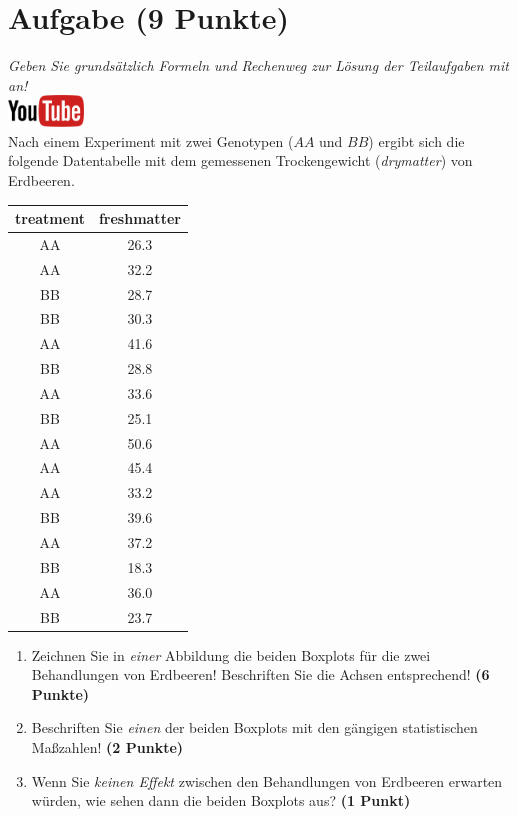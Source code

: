 \documentclass[a4paper, 10pt]{scrartcl}\usepackage[]{graphicx}\usepackage[]{xcolor}
\begin{document}
 
\clearpage

\section{Aufgabe \hfill (9 Punkte)}

\textit{Geben Sie grunds{\"a}tzlich Formeln und Rechenweg zur L{\"o}sung der
  Teilaufgaben mit an!} \\[1Ex]

\hfill\href{https://youtu.be/0xc0jIPeiyw}{\includegraphics[width =
  2cm]{img/youtube}}\\[1Ex]



Nach einem Experiment mit zwei Genotypen ($AA$ und $BB$) ergibt sich die
folgende Datentabelle mit dem gemessenen Trockengewicht
(\textit{drymatter})  von Erdbeeren. 

\begin{table}[!h]
\centering
\begin{tabular}{cc}
\toprule
treatment & freshmatter\\
\midrule
AA & 26.3\\
AA & 32.2\\
BB & 28.7\\
BB & 30.3\\
AA & 41.6\\
\addlinespace
BB & 28.8\\
AA & 33.6\\
BB & 25.1\\
AA & 50.6\\
AA & 45.4\\
\addlinespace
AA & 33.2\\
BB & 39.6\\
AA & 37.2\\
BB & 18.3\\
AA & 36.0\\
\addlinespace
BB & 23.7\\
\bottomrule
\end{tabular}
\end{table}



\begin{enumerate}
\item Zeichnen Sie in \textit{einer} Abbildung die beiden Boxplots f{\"u}r die
  zwei Behandlungen von Erdbeeren! Beschriften Sie die Achsen entsprechend!
  \textbf{(6 Punkte)}
\item Beschriften Sie \textit{einen} der beiden Boxplots mit den g{\"a}ngigen
  statistischen Ma{\ss}zahlen! \textbf{(2 Punkte)}
\item Wenn Sie \textit{keinen Effekt} zwischen den Behandlungen von
  Erdbeeren erwarten w{\"u}rden, wie sehen dann die beiden Boxplots aus?
  \textbf{(1 Punkt)}
\end{enumerate} 
\clearpage
\end{document}
